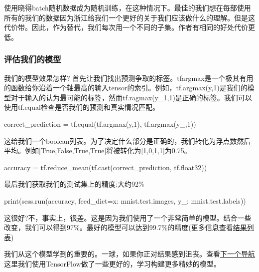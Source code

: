 使用晓得batch随机数据成为随机训练，在这种情况下。最佳的我们想在每部使用所有的我们的数据因为浙江给我们一个更好的关于我们应该做什么的理解。但是这代价带。因此，作为替代，我们每次用一个不同的子集。作者有相同的好处代价更低。
\subsubsection{评估我们的模型}
我们的模型效果怎样?
首先让我们找出预测争取的标签。tfargmax是一个极其有用的函数给你沿着一个轴最高的输入tensor的索引。例如，tf.argmax(y,1)是我们的模型对于输入的认为最可能的标签，然而tf.ragmax(y\_1,1)是正确的标签。我们可以使用tf.equal检查是否我们的预测和真实情况匹配。
\begin{pythoncode}
correct_prediction = tf.equal(tf.argmax(y,1), tf.argmax(y_,1))
\end{pythoncode}
这给我们一个boolean列表。为了决定什么部分是正确的，我们转化为浮点数然后平均。例如[True,False,True,True]将被转化为[1,0,1,1]为0.75。
\begin{pythoncode}
accuracy = tf.reduce_mean(tf.cast(correct_prediction, tf.float32))
\end{pythoncode}
最后我们获取我们的测试集上的精度:大约92\%
\begin{pythoncode}
print(sess.run(accuracy, feed_dict={x: mnist.test.images, y_: mnist.test.labels}))
\end{pythoncode}
这很好?不，事实上，很差。这是因为我们使用了一个非常简单的模型。结合一些改变，我们可以得到97\%。最好的模型可以达到99.7\%的精度(更多信息查看\href{https://rodrigob.github.io/are_we_there_yet/build/classification_datasets_results}{结果列表})

我们从这个模型学到的重要的。一球，如果你正对结果感到沮丧。查看\href{https://www.tensorflow.org/get_started/mnist/pros}{下一个导航}这里我们使用TensorFlow做了一些更好的，学习构建更多精妙的模型。
